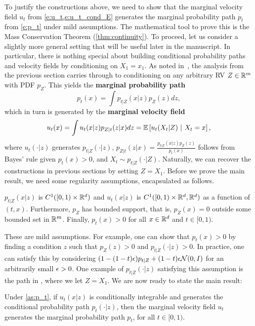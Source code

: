 \documentclass{fairmeta}
\newcommand{\highlight}[1]{{\color{metablue} \textbf{#1}}}
\renewcommand{\eqref}[1]{\labelcref{#1}}
\numberwithin{equation}{section}
\begin{document}
To justify the constructions above, we need to show that the marginal velocity field $u_t$ from \cref{e:u_t,e:u_t_cond_E} generates the marginal probability path $p_t$ from \cref{e:p_t} under mild assumptions.
The mathematical tool to prove this is the Mass Conservation Theorem (\cref{thm:continuity}).
To proceed, let us consider a slightly more general setting that will be useful later in the manuscript.
In particular, there is nothing special about building conditional probability paths and velocity fields by conditioning on $X_1=x_1$.
As noted in~\cite{tong2023improving}, the analysis from the previous section carries through to conditioning on any arbitrary RV $Z\in\mathbb R^m$ with PDF $p_Z$.
This yields the \highlight{marginal probability path}
\begin{equation}\label{e:p_t_general}
    p_t(x) = \int p_{t|Z}(x|z) p_Z(z) dz,  %
\end{equation}
which in turn is generated by the \highlight{marginal velocity field} 
\begin{align}\label{e:u_t_general}
   u_t(x) = \int u_t(x|z) p_{Z|t}(z|x) dz = \E\brac{u_t(X_t|Z) \ \vert \ X_t=x},
\end{align}
where $u_t(\cdot|z)$ generates $p_{t|Z}(\cdot|z)$, $p_{Z|t}(z|x) = \frac{p_{t|Z}(x|z)p_Z(z)}{p_t(x)}$ follows from Bayes' rule given $p_t(x)>0$, and $X_t\sim p_{t|Z}(
\cdot|Z)$.
Naturally, we can recover the constructions in previous sections by setting $Z=X_1$.
Before we prove the main result, we need some regularity assumptions, encapsulated as follows.
\begin{myframe}
\begin{assumption}\label{as:p_t}
$p_{t|Z}(x|z)$ is $C^1([0,1)\times \mathbb R^d)$ and $u_t(x|z)$ is $C^1([0,1)\times \mathbb R^d,\mathbb R^d)$ as a function of $(t,x)$.
Furthermore, $p_Z$ has bounded support, that is, $p_Z(x)=0$ outside some bounded set in $\mathbb R^m$.
Finally, $p_t(x)>0$ for all $x\in\mathbb R^d$ and $t\in[0,1)$.
\end{assumption}    
\end{myframe}
These are mild assumptions.
For example, one can show that $p_t(x) > 0$ by finding a condition $z$ such that $p_Z(z)>0$ and $p_{t|Z}(\cdot|z)>0$.
In practice, one can satisfy this by considering $(1-(1-t){\epsilon})p_{t|Z} + (1-t){\epsilon} {\mathcal{N}}(0,I)$ for an arbitrarily small ${\epsilon} > 0$.
One example of $p_{t|Z}(\cdot|z)$ satisfying this assumption is the path in \eqref{e:condot_path}, where we let $Z=X_1$.
We are now ready to state the main result:
\begin{myframe}[nobreak=true]
    \begin{theorem}\label{thm:fm_main} Under \cref{as:p_t}, if $u_t(x|z)$ is conditionally integrable and generates the conditional probability path $p_t(\cdot|z)$, then the marginal velocity field $u_t$ generates the marginal probability path $p_t$, for all $t\in[0,1)$.
\end{theorem}
\end{myframe}
\end{document}
